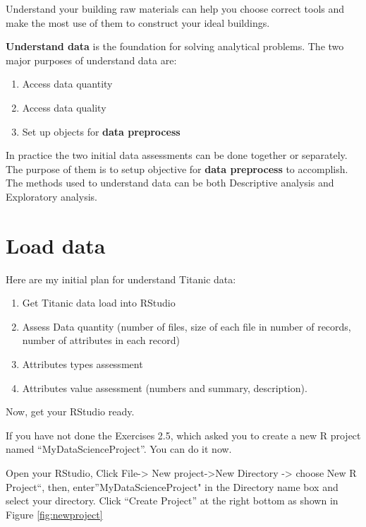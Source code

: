 \documentclass[
]{book}
\providecommand{\tightlist}{%
  \setlength{\itemsep}{0pt}\setlength{\parskip}{0pt}}
\begin{document}
Understand your building raw materials can help you choose correct tools and make the most use of them to construct your ideal buildings.

\textbf{Understand data} is the foundation for solving analytical problems. The two major purposes of understand data are:

\begin{enumerate}
\def\labelenumi{\arabic{enumi}.}
\tightlist
\item
  Access data quantity
\item
  Access data quality
\item
  Set up objects for \textbf{data preprocess}
\end{enumerate}

In practice the two initial data assessments can be done together or separately. The purpose of them is to setup objective for \textbf{data preprocess} to accomplish. The methods used to understand data can be both Descriptive analysis and Exploratory analysis.

\hypertarget{load-data}{%
\section{Load data}\label{load-data}}

Here are my initial plan for understand Titanic data:

\begin{enumerate}
\def\labelenumi{\arabic{enumi}.}
\tightlist
\item
  Get Titanic data load into RStudio
\item
  Assess Data quantity (number of files, size of each file in number of records, number of attributes in each record)
\item
  Attributes types assessment
\item
  Attributes value assessment (numbers and summary, description).
\end{enumerate}

Now, get your RStudio ready.

If you have not done the Exercises 2.5, which asked you to create a new R project named ``MyDataScienceProject''. You can do it now.

Open your RStudio, Click File-\textgreater{} New project-\textgreater New Directory -\textgreater{} choose New R Project``, then, enter''MyDataScienceProject" in the Directory name box and select your directory. Click ``Create Project'' at the right bottom as shown in Figure \ref{fig:newproject}
\end{document}
